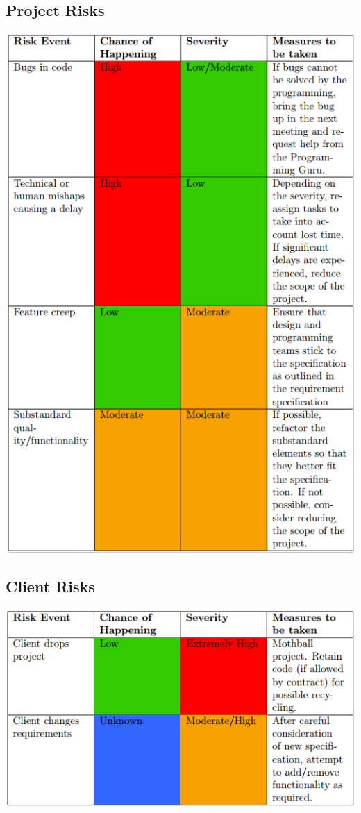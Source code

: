 \documentclass[12pt]{article}
\begin{document}
	\subsection{Project Risks}
		\begin{center}
			\includegraphics{Project_Risks}
		\end{center}

	\subsection{Client Risks}
		\begin{center}
			\includegraphics{Client_Risks}
		\end{center}
\end{document}
